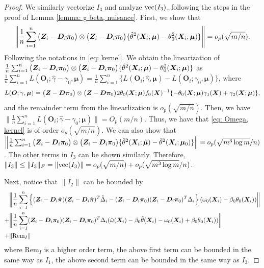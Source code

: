 \documentclass[12pt]{article}
\begin{document}
{\begin{proof}
	
We similarly vectorize  $ I_3 $ and analyze $ {\rm vec}(I_3) $, following the steps in the proof of Lemma \ref{lemma: g beta, nuisance}. First, we show that 
	\begin{align}
		\left\|	\frac1n \sum_{i=1}^n  \big( \bm{Z}_i-\bm D_i \bm\pi_0 \big) \otimes\big( \bm{Z}_i-\bm D_i \bm\pi_0 \big)  \{\hat\theta^2(\bm{X}_i; \bm \mu )   - \theta_0^2(\bm{X}_i; \bm \mu ) \} \right\|  =  o_p(\sqrt{m/n}) \label{eq: Omega, kernel}.
	\end{align}
Following the notations in \eqref{eq: kernel}. We obtain the linearization of $		\frac1n \sum_{i=1}^{n}  \big( \bm{Z}_i-\bm D_i \bm\pi_0 \big) \otimes\big( \bm{Z}_i-\bm D_i \bm\pi_0 \big)  \{\hat\theta^2(\bm{X}_i; \bm \mu )   - \theta_0^2(\bm{X}_i; \bm \mu ) \} $ as $ \frac1n \sum_{i=1}^{n} L(\bm O_i; \hat\gamma- \gamma_0, \bm \mu) = \frac1n \sum_{i=1}^{n} \{ L(\bm O_i; \hat\gamma, \bm \mu) -  L(\bm O_i; \gamma_0, \bm \mu) \} $, where 
\begin{align*}
	 L(\bm O; \gamma, \bm \mu) =   \big( \bm{Z}-\bm D \bm\pi_0 \big) \otimes\big( \bm{Z}-\bm D \bm\pi_0 \big) 2\theta_0 (\bm{X}; \bm\mu) f_0(\bm{X})^{-1} \{-\theta_0(\bm{X}; \bm\mu) \gamma_1(\bm{X}) + \gamma_2(\bm{X}; \bm\mu)\}, 
\end{align*}
and the remainder term from the linearlization is $ o_p(\sqrt{m/n}) $. Then, we have $ \|\frac{1}{n}\sum_{i=1}^{n}L(\bm O_i;\hat\gamma- \gamma_0; \bm\mu ) \|=  O_p(m/n)$. Thus, we have that \eqref{eq: Omega, kernel} is of order $ o_p(\sqrt{m/n}) $. We can also show that $ 	\left\|	\frac1n \sum_{i=1}^n  \big( \bm{Z}_i-\bm D_i \bm\pi_0 \big) \otimes\big( \bm{Z}_i-\bm D_i \bm\pi_0 \big)  \{\hat\theta^2(\bm{X}_i; \hat {\bm \mu} )   -\hat \theta^2(\bm{X}_i; \bm \mu_0 ) \} \right\|  =  o_p(\sqrt{m^3\log m}/n) $. The other terms in $ I_3 $ can be shown similarly. Therefore, $\|I_3\|\leq  \|I_3\|_F =  \|{\rm vec} (I_3)\| = o_p(\sqrt{m/n})  +  o_p(\sqrt{m^3\log m}/n)$.  


Next, notice that $\| I_2\| $ can be bounded by 
\begin{align*}
 &  \bigg\|  \frac{1}{n} \sum_{i=1}^{n}\left\{ (\bm{Z}_i - \bm D_i \hat{\bm\pi}) (\bm{Z}_i - \bm D_i \hat{\bm\pi})^T \hat\Delta_i -(\bm{Z}_i - \bm D_i {\bm\pi}_0 ) (\bm{Z}_i - \bm D_i {\bm\pi_0})^T \Delta_i \right\} (\omega_0(\bm{X}_i)- \beta_0\theta_0(\bm{X}_i))\bigg\|\\
	  + &\bigg\|  \frac{1}{n} \sum_{i=1}^{n}(\bm{Z}_i - \bm D_i {\bm\pi}_0 ) (\bm{Z}_i - \bm D_i {\bm\pi_0})^T \Delta_i (\hat\omega(\bm{X}_i)- \beta_0\hat\theta(\bm{X}_i) - \omega_0(\bm{X}_i) + \beta_0 \theta_0(\bm{X}_i) )\bigg\|\\
	  +& \|\text{Rem}_I\|
\end{align*}  
where $ \text{Rem}_I $ is a higher order term, the above first term can be bounded in the same way as $ I_1 $, the above second term can be bounded in the same way as $ I_3 $. 
	


\end{proof}}
\end{document}
